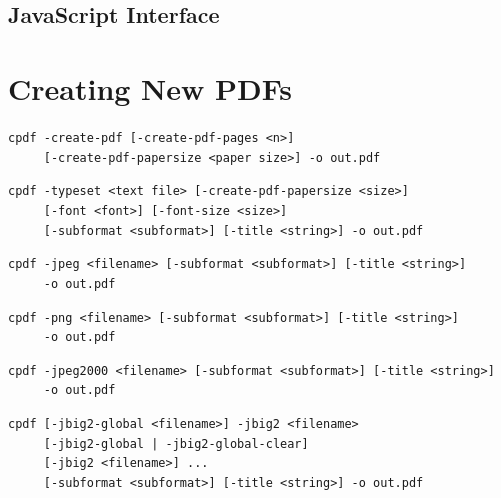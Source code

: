 \documentclass{book}
\begin{document}
\begin{jscpdflib}
\clearpage
\section*{JavaScript Interface}
\begin{small}\tt

\end{small}
\end{jscpdflib}

\clearpage\pagestyle{empty}
\chapter{Creating New PDFs}\label{chap:17}\pagestyle{fancy}

  {\small\begin{framed}
  \noindent\verb!cpdf -create-pdf [-create-pdf-pages <n>]!\\
  \noindent\verb!     [-create-pdf-papersize <paper size>] -o out.pdf!


  \vspace{1.5mm}
  \noindent\verb!cpdf -typeset <text file> [-create-pdf-papersize <size>]!\\
  \noindent\verb!     [-font <font>] [-font-size <size>]!\\
  \noindent\verb!     [-subformat <subformat>] [-title <string>] -o out.pdf!

  \vspace{1.5mm}
  \noindent\verb!cpdf -jpeg <filename> [-subformat <subformat>] [-title <string>]!\\
  \noindent\verb!     -o out.pdf!

  \vspace{1.5mm}
  \noindent\verb!cpdf -png <filename> [-subformat <subformat>] [-title <string>]!\\
  \noindent\verb!     -o out.pdf!

  \vspace{1.5mm}
  \noindent\verb!cpdf -jpeg2000 <filename> [-subformat <subformat>] [-title <string>]!\\
  \noindent\verb!     -o out.pdf!

  \vspace{1.5mm}
  \noindent\verb!cpdf [-jbig2-global <filename>] -jbig2 <filename>!\\
  \noindent\verb!     [-jbig2-global | -jbig2-global-clear]!\\
  \noindent\verb!     [-jbig2 <filename>] ...!\\
  \noindent\verb!     [-subformat <subformat>] [-title <string>] -o out.pdf!
  \end{framed}}
\end{document}
